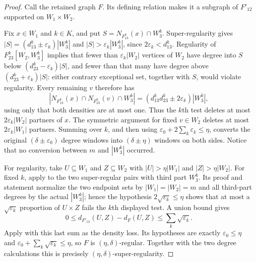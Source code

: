 \begin{proof}
Call the retained graph $F$.  Its defining relation makes it a subgraph of
$F'_{12}$ supported on $W_1\times W_2$.

Fix $x\in W_1$ and $k\in K$, and put
$S=N_{F_{13}^k}(x)\cap W_3^k$.  Super-regularity gives
$|S|=(d_{13}^k\pm\varepsilon_k)|W_3^k|$ and
$|S|>\varepsilon_k|W_3^k|$, since $2\varepsilon_k<d_{13}^k$.
Regularity of $F_{23}^k[W_2,W_3^k]$ implies that fewer than
$\varepsilon_k|W_2|$ vertices of $W_2$ have degree into $S$ below
$(d_{23}^k-\varepsilon_k)|S|$, and fewer than that many have degree above
$(d_{23}^k+\varepsilon_k)|S|$: either contrary exceptional set, together
with $S$, would violate regularity.  Every remaining $v$ therefore has
\[
 |N_{F_{13}^k}(x)\cap N_{F_{23}^k}(v)\cap W_3^k|
 =(d_{13}^kd_{23}^k\pm2\varepsilon_k)|W_3^k|,
\]
using only that both densities are at most one.  Thus the $k$th test deletes
at most $2\varepsilon_k|W_2|$ partners of $x$.  The symmetric argument for
fixed $v\in W_2$ deletes at most $2\varepsilon_k|W_1|$ partners.  Summing
over $k$, and then using
$\varepsilon_0+2\sum_k\varepsilon_k\leq\eta$, converts the original
$(\delta\pm\varepsilon_0)$ degree windows into
$(\delta\pm\eta)$ windows on both sides.  Notice that no conversion between
$m$ and $|W_3^k|$ occurred.

For regularity, take $U\subseteq W_1$ and $Z\subseteq W_2$ with
$|U|>\eta|W_1|$ and $|Z|>\eta|W_2|$.  For fixed $k$, apply
 to the two super-regular pairs with third
part $W_3^k$.  Its proof and statement normalize the two endpoint sets by
$|W_1|=|W_2|=m$ and all third-part degrees by the actual $|W_3^k|$; hence
the hypothesis $2\sqrt{\varepsilon_k}\leq\eta$ shows that at most a
$\sqrt{\varepsilon_k}$ proportion of $U\times Z$ fails the $k$th displayed
test.  A union bound gives
\[
 0\leq d_{F'_{12}}(U,Z)-d_F(U,Z)
 \leq\sum_k\sqrt{\varepsilon_k}.
\]
Apply  with this last sum as the density
loss.  Its hypotheses are exactly $\varepsilon_0\leq\eta$ and
$\varepsilon_0+\sum_k\sqrt{\varepsilon_k}\leq\eta$, so $F$ is
$(\eta,\delta)$-regular.  Together with the two degree calculations this is
precisely $(\eta,\delta)$-super-regularity.
\end{proof}
